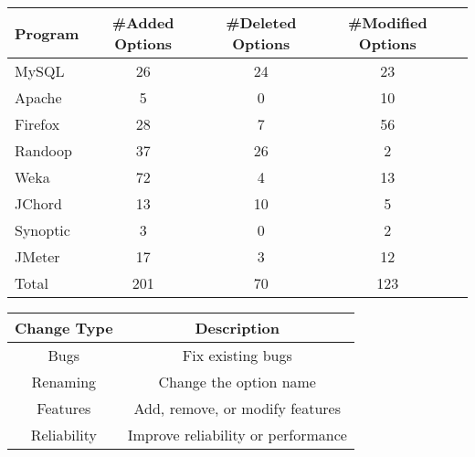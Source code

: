 \begin{table}[t]
\vspace{1mm}
\centering
\small{
\setlength{\tabcolsep}{.50\tabcolsep}
\begin{tabular}{|l||c|c|c|c|}
\hline
 Program & \#Added Options & \#Deleted Options& \#Modified Options\\
 \hline
 \hline
 MySQL& 26 & 24 & 23 \\
 Apache & 5 & 0 & 10 \\
 Firefox& 28 & 7 & 56 \\
 Randoop & 37  & 26 & 2\\
 Weka &  72 & 4 & 13 \\
 JChord & 13  & 10 & 5 \\
 Synoptic & 3 & 0 & 2 \\
 JMeter & 17  & 3 &  12 \\
\hline
\hline
 Total & 201 & 70 & 123 \\
\hline
\end{tabular}
}
\vspace{-2mm}
\end{table}


\begin{table}[t]
\vspace{1mm}
\centering
\small{
\setlength{\tabcolsep}{.50\tabcolsep}
\begin{tabular}{|c|c|}
\hline
 \textbf{Change Type} & \textbf{Description} \\
 \hline
 \hline
Bugs & Fix existing bugs\\
 \hline
Renaming & Change the option name\\
 \hline
Features & Add, remove, or modify features\\
 \hline
Reliability & Improve reliability or performance\\
\hline
\end{tabular}
}
\vspace{-2mm}
\end{table}

